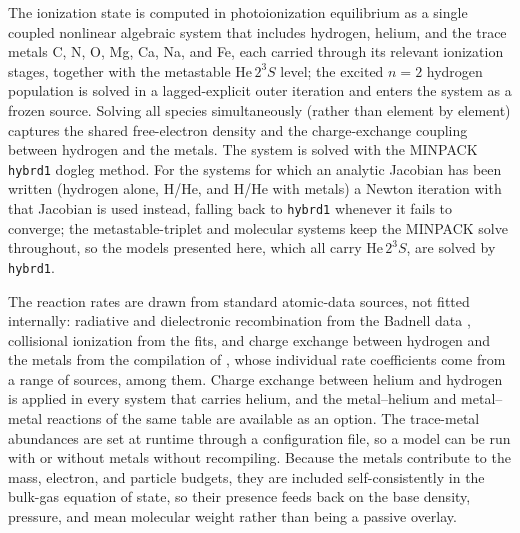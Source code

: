 \documentclass[twocolumn]{aastex702}
\newcommand{\HeTS}{\mathrm{He}\,2^{3}S}
\begin{document}
The ionization state is computed in photoionization equilibrium as a single coupled
nonlinear algebraic system that includes hydrogen, helium, and the trace metals C, N, O,
Mg, Ca, Na, and Fe, each carried through its relevant ionization stages, together with
the metastable $\HeTS$ level; the excited $n=2$ hydrogen population is solved in a
lagged-explicit outer iteration and enters the system as a frozen source. Solving all
species simultaneously (rather than element by element) captures the shared free-electron
density and the charge-exchange coupling between hydrogen and the metals. The system is
solved with the MINPACK \texttt{hybrd1} dogleg method. For the systems for which an
analytic Jacobian has been written (hydrogen alone, H/He, and H/He with metals) a
Newton iteration with that Jacobian is used instead, falling back to \texttt{hybrd1}
whenever it fails to converge; the metastable-triplet and molecular systems keep the
MINPACK solve throughout, so the models presented here, which all carry $\HeTS$, are
solved by \texttt{hybrd1}.

The reaction rates are drawn from standard atomic-data sources, not fitted internally:
radiative and dielectronic recombination from the Badnell data
\citep{Badnell2006rr,Badnell2003dr}, collisional ionization from the
\citet{Voronov1997} fits, and charge exchange between hydrogen and the metals from the
compilation of \citet[][their Table 4]{Huang2023}, whose individual rate coefficients
come from a range of sources, \citet{KingdonFerland1996} among them. Charge exchange
between helium and hydrogen is applied in every system that carries helium, and the
metal--helium and metal--metal reactions of the same table are available as an option.
The
trace-metal abundances are set at runtime through a
configuration file, so a model can be run with or without metals without recompiling.
Because the metals contribute to the mass, electron, and particle budgets, they are
included self-consistently in the bulk-gas equation of state, so their presence feeds
back on the base density, pressure, and mean molecular weight rather than being a passive
overlay.
\end{document}
